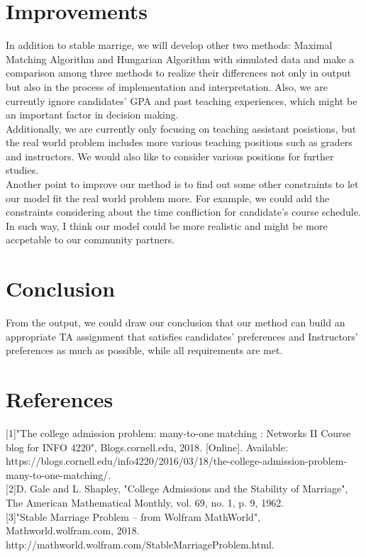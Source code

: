 \documentclass[twoside,twocolumn]{article}
\begin{document}
    \section{Improvements}
    \indent In addition to stable marrige, we will develop other two methods: Maximal Matching Algorithm and Hungarian Algorithm with simulated data and make a 
    comparison among three methods to realize their differences not only in output but also in the process of implementation and 
    interpretation. Also, we are currently ignore candidates' GPA and past teaching experiences, which might be an important factor in decision 
    making. 
    \\ \indent Additionally, we are currently only focusing on teaching assistant posistions, but the real world problem includes more various teaching
    positions such as graders and instructors. We would also like to consider various positions for further studies.
    \\ \indent Another point to improve our method is to find out some other constraints to let our model fit the real world problem more. For example,
    we could add the constraints considering about the time confliction for candidate's course schedule. 
    \\ \indent In such way, I think our model could be more realistic and might be more accpetable to our community partners.
    \section{Conclusion}
    \indent From the output, we could draw our conclusion that our method can build an appropriate TA assignment that satisfies candidates' preferences
    and Instructors' preferences as much as possible, while all requirements are met.
    \section{References}
    [1]"The college admission problem: many-to-one matching : Networks II Course blog for INFO 4220", Blogs.cornell.edu, 2018. [Online]. 
    Available: https://blogs.cornell.edu/info4220/2016/03/18/the-college-admission-problem-many-to-one-matching/. \\

    [2]D. Gale and L. Shapley, "College Admissions and the Stability of Marriage", The American Mathematical Monthly, vol. 69, no. 1, p. 9, 1962. \\
    
    [3]"Stable Marriage Problem -- from Wolfram MathWorld", Mathworld.wolfram.com, 2018. http://mathworld.wolfram.com/StableMarriageProblem.html. \\
    
\end{document}

